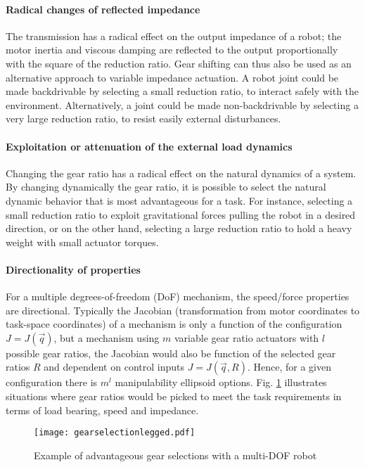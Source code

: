 \paragraph{Radical changes of reflected impedance}
The transmission has a radical effect on the output impedance of a robot; the motor inertia and viscous damping are reflected to the output proportionally with the square of the reduction ratio. Gear shifting can thus also be used as an alternative approach to variable impedance actuation. A robot joint could be made backdrivable by selecting a small reduction ratio, to interact safely with the environment.  Alternatively, a joint could be made non-backdrivable by selecting a very large reduction ratio, to resist easily external disturbances.

\paragraph{Exploitation or attenuation of the external load dynamics}
Changing the gear ratio has a radical effect on the natural dynamics of a system. By changing dynamically the gear ratio, it is possible to select the natural dynamic behavior that is most advantageous for a task. For instance, selecting a small reduction ratio to exploit gravitational forces pulling the robot in a desired direction, or on the other hand, selecting a large reduction ratio to hold a heavy weight with small actuator torques.

\paragraph{Directionality of properties}
For a multiple degrees-of-freedom (DoF) mechanism, the speed/force properties are directional. Typically the Jacobian (transformation from motor coordinates to task-space coordinates) of a mechanism is only a function of the configuration $J=J(\vec{q})$, but a mechanism using $m$ variable gear ratio actuators with $l$ possible gear ratios, the Jacobian would also be function of the selected gear ratios $R$ and dependent on control inputs $J=J(\vec{q},R)$. Hence, for a given configuration there is $m^l$ manipulability ellipsoid options. Fig. \ref{fig:gearselectionlegged} illustrates situations where gear ratios would be picked to meet the task requirements in terms of load bearing, speed and impedance. 


\begin{figure}[hb]
	\centering
		\texttt{[image: gearselectionlegged.pdf]}
	\caption{Example of advantageous gear selections with a multi-DOF robot}
	\label{fig:gearselectionlegged}
\end{figure}

